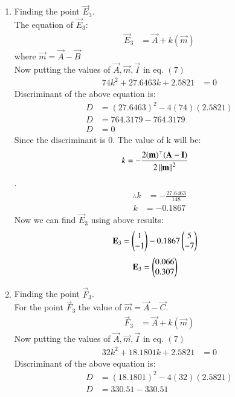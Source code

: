 \documentclass[journal,12pt,twocolumn]{IEEEtran}
\theoremstyle{remark}
\begin{document}
\begin{enumerate}
\item Finding the point $\vec{E}_3$.\\
The equation of $\vec{E}_3$:
\begin{align}
\vec{E}_3 &=\vec{A}+k(\vec{m})
\end{align}
where $\vec{m} = \vec{A}-\vec{B}$ \\
Now putting the values of $\vec{A}, \vec{m}, \vec{I}$ in eq. $(7)$
\begin{align}
74k^2+27.6463k+2.5821 &= 0
\end{align}
Discriminant of the above equation is:
\begin{align}
D &= (27.6463)^2-4(74)(2.5821)\\
D &= 764.3179-764.3179\\
D &= 0
\end{align}
Since the discriminant is $0$. The value of k will be:
\begin{align}
k &= -\frac{2(\mathbf{m})^\top(\mathbf{A-I})}{2\left\lVert\mathbf{m}\right\rVert^2}
\end{align}.
\begin{align}
\therefore k &= -\frac{27.6463}{148}
\end{align}
\begin{align}
k &= -0.1867
\end{align}
Now we can find $\vec{E}_3$ using above results:
\begin{align}
\mathbf{E}_3 &=\begin{pmatrix}1\\-1\end{pmatrix}-0.1867\begin{pmatrix}5\\-7\end{pmatrix}
\end{align}
\begin{align}
\mathbf{E}_3 &=\begin{pmatrix}0.066\\0.307\end{pmatrix}
\end{align}
\item Finding the point $\vec{F}_3$.\\
For the point $\vec{F}_3$ the value of $\vec{m} = \vec{A}-\vec{C}$. 
\begin{align}
\vec{F}_3 &=\vec{A}+k(\vec{m})
\end{align}
Now putting the values of $\vec{A}, \vec{m}, \vec{I}$ in eq. $(7)$
\begin{align}
32k^2+18.1801k+2.5821 &= 0
\end{align}
Discriminant of the above equation is:
\begin{align}
D &= (18.1801)^2-4(32)(2.5821)\\
D &= 330.51-330.51\\

\end{align}
\end{enumerate}
\end{document}

